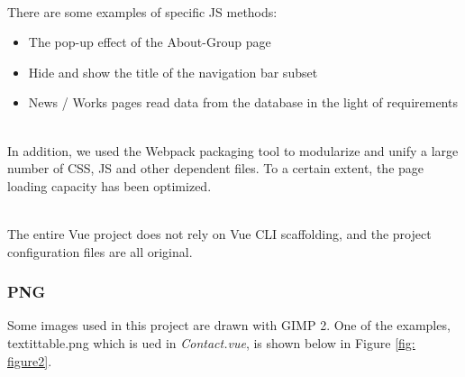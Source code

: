 \documentclass{article}
\begin{document}
~\\
\noindent
There are some examples of specific JS methods:
\begin{itemize}
    \item The pop-up effect of the About-Group page
    \item Hide and show the title of the navigation bar subset
    \item News / Works pages read data from the database in the light of requirements
\end{itemize}

~\\
\noindent
In addition, we used the Webpack packaging tool to modularize and 
unify a large number of CSS, JS and other dependent files. To a certain 
extent, the page loading capacity has been optimized.

~\\
\noindent
The entire Vue project does not rely on Vue CLI scaffolding, 
and the project configuration files are all original.

\subsubsection{PNG}
Some images used in this project are drawn with GIMP 2. One of the examples,
textit{table.png} which is ued in \textit{Contact.vue}, is shown below in 
Figure \ref{fig: figure2}.
\end{document}
